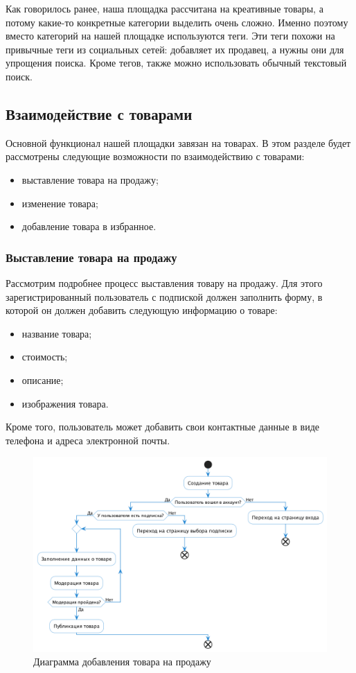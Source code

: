\documentclass[a4paper,14pt]{extarticle}
\begin{document}
Как говорилось ранее, наша площадка рассчитана на креативные товары, а потому какие-то конкретные категории выделить очень сложно. Именно поэтому вместо категорий на нашей площадке используются теги. Эти теги похожи на привычные теги из социальных сетей: добавляет их продавец, а нужны они для упрощения поиска. Кроме тегов, также можно использовать обычный текстовый поиск.

\subsection{Взаимодействие с товарами}

Основной функционал нашей площадки завязан на товарах. В этом разделе будет рассмотрены следующие возможности по взаимодействию с товарами:
\begin{itemize}
    \item выставление товара на продажу;
    \item изменение товара;
    \item добавление товара в избранное.
\end{itemize}

\subsubsection*{Выставление товара на продажу}

Рассмотрим подробнее процесс выставления товару на продажу. Для этого зарегистрированный пользователь с подпиской должен заполнить форму, в которой он должен добавить следующую информацию о товаре:
\begin{itemize}
    \item название товара;
    \item стоимость;
    \item описание;
    \item изображения товара.
\end{itemize}
Кроме того, пользователь может добавить свои контактные данные в виде телефона и адреса электронной почты.

\begin{figure}[H]
    \centering
    \includegraphics[width=\textwidth]{images/add_item.png}
    \caption{Диаграмма добавления товара на продажу}
\end{figure}
\end{document}
